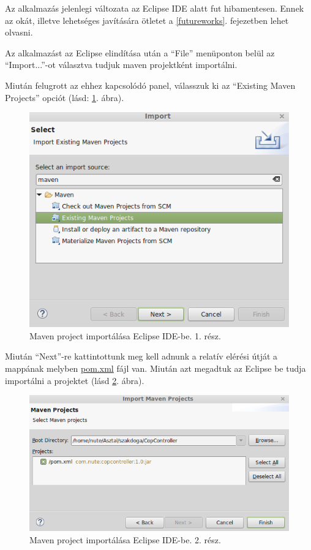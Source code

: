 \documentclass[a4paper,12pt]{report}
\begin{document}
Az alkalmazás jelenlegi változata az Eclipse IDE alatt fut hibamentesen. Ennek az okát, illetve lehetséges javítására ötletet a \ref{futureworks}. fejezetben lehet olvasni. 

\vspace{2mm}
Az alkalmazást az Eclipse elindítása után a ``File'' menüponton belül az ``Import...''-ot választva tudjuk maven projektként importálni.

\vspace{2mm}
Miután felugrott az ehhez kapcsolódó panel, válasszuk ki az ``Existing Maven Projects'' opciót (lásd: \ref{importmaven1}. ábra).

\begin{figure}[ht]
\centerline{
\includegraphics[width=5in]{img/importmavenproject}}
\caption{Maven project importálása Eclipse IDE-be. 1. rész.}
\label{importmaven1}
\end{figure}

\vspace{2mm}
Miután ``Next''-re kattintottunk meg kell adnunk a relatív elérési útját a mappának melyben \url{pom.xml} fájl van. Miután azt megadtuk az Eclipse be tudja importálni a projektet (lásd \ref{importmaven2}. ábra).

\begin{figure}[ht]
\centerline{
\includegraphics[width=6in]{img/importmavenproject2}}
\caption{Maven project importálása Eclipse IDE-be. 2. rész.}
\label{importmaven2}
\end{figure}
\end{document}
